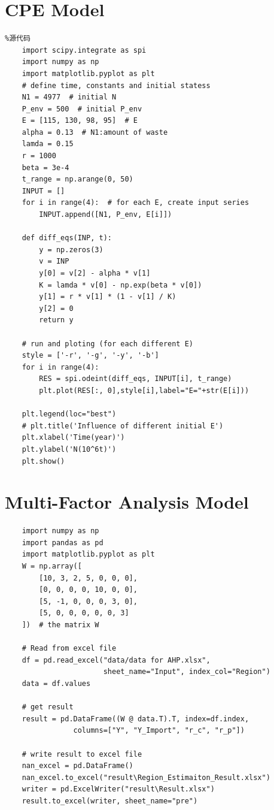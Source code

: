 \documentclass{mcmthesis}
\begin{document}



\newpage
\begin{appendices}

\section{CPE Model}
\begin{lstlisting}%源代码	
	import scipy.integrate as spi
	import numpy as np
	import matplotlib.pyplot as plt
	# define time, constants and initial statess
	N1 = 4977  # initial N
	P_env = 500  # initial P_env
	E = [115, 130, 98, 95]  # E
	alpha = 0.13  # N1:amount of waste
	lamda = 0.15
	r = 1000
	beta = 3e-4
	t_range = np.arange(0, 50)
	INPUT = []
	for i in range(4):  # for each E, create input series
		INPUT.append([N1, P_env, E[i]])

	def diff_eqs(INP, t):
		y = np.zeros(3)
		v = INP
		y[0] = v[2] - alpha * v[1]
		K = lamda * v[0] - np.exp(beta * v[0])
		y[1] = r * v[1] * (1 - v[1] / K)
		y[2] = 0
		return y
	
	# run and ploting (for each different E)
	style = ['-r', '-g', '-y', '-b']
	for i in range(4):
		RES = spi.odeint(diff_eqs, INPUT[i], t_range)
		plt.plot(RES[:, 0],style[i],label="E="+str(E[i]))
	
	plt.legend(loc="best")
	# plt.title('Influence of different initial E')
	plt.xlabel('Time(year)')
	plt.ylabel('N(10^6t)')
	plt.show()
\end{lstlisting}
\newpage
\section{Multi-Factor Analysis Model}
\begin{lstlisting}
	import numpy as np
	import pandas as pd
	import matplotlib.pyplot as plt
	W = np.array([
		[10, 3, 2, 5, 0, 0, 0],
		[0, 0, 0, 0, 10, 0, 0],
		[5, -1, 0, 0, 0, 3, 0],
		[5, 0, 0, 0, 0, 0, 3]
	])  # the matrix W

	# Read from excel file
	df = pd.read_excel("data/data for AHP.xlsx",
					   sheet_name="Input", index_col="Region")
	data = df.values
	
	# get result
	result = pd.DataFrame((W @ data.T).T, index=df.index,
				columns=["Y", "Y_Import", "r_c", "r_p"])
	
	# write result to excel file
	nan_excel = pd.DataFrame()
	nan_excel.to_excel("result\Region_Estimaiton_Result.xlsx")
	writer = pd.ExcelWriter("result\Result.xlsx")
	result.to_excel(writer, sheet_name="pre")


\end{lstlisting}
\end{appendices}
\end{document}
